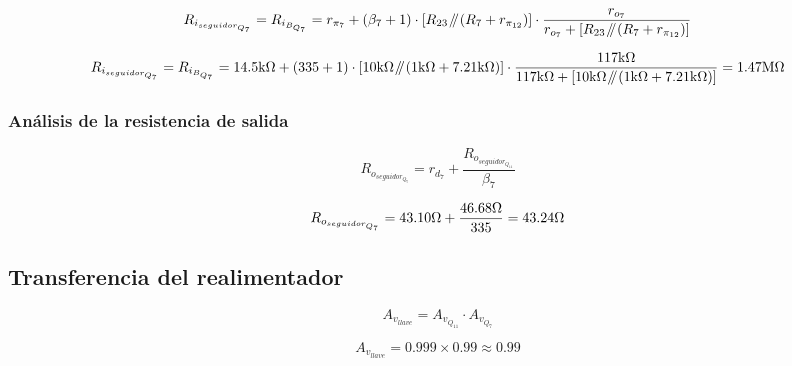 \begin{equation}
R_{i_{seguidor_{Q_{7}}}} = R_{i_{B_{Q_{7}}}} = r_{\pi_{7}} + \left( \beta_{7} + 1 \right) \cdot  \left[  R_{23} \parallelresistors \left(  R_{7} + r_{\pi_{12}} \right)   \right]  \cdot \frac{  r_{o_{7}} }{  r_{o_{7}} + \left[  R_{23} \parallelresistors \left(  R_{7} + r_{\pi_{12}} \right)   \right]  }
\end{equation}


\begin{equation*}
R_{i_{seguidor_{Q_{7}}}} = R_{i_{B_{Q_{7}}}} = 14.5 \si[per-mode=symbol]{\kilo\ohm} + \left( 335 + 1 \right) \cdot  \left[  10 \si[per-mode=symbol]{\kilo\ohm} \parallelresistors \left(  1 \si[per-mode=symbol]{\kilo\ohm} + 7.21 \si[per-mode=symbol]{\kilo\ohm} \right)   \right]  \cdot \frac{  117 \si[per-mode=symbol]{\kilo\ohm} }{  117 \si[per-mode=symbol]{\kilo\ohm} + \left[  10 \si[per-mode=symbol]{\kilo\ohm} \parallelresistors \left(  1 \si[per-mode=symbol]{\kilo\ohm} + 7.21 \si[per-mode=symbol]{\kilo\ohm} \right)   \right]  } = 1.47 \si[per-mode=symbol]{\mega\ohm}
\end{equation*}

\subsubsection{Análisis de la resistencia de salida}

\begin{equation}
R_{o_{seguidor_{Q_{7}}}} = r_{d_{7}} + \frac{R_{o_{seguidor_{Q_{11}}}}}{\beta_{7}}  
\end{equation}

\begin{equation*}
R_{o_{seguidor_{Q_{7}}}} = 43.10 \si[per-mode=symbol]{\ohm} + \frac{46.68 \si[per-mode=symbol]{\ohm}}{335} = 43.24 \si[per-mode=symbol]{\ohm} 
\end{equation*}


\subsection{Transferencia del realimentador}

\begin{equation}
A_{v_{llave}} = A_{v_{Q_{11}}} \cdot A_{v_{Q_{7}}}
\end{equation}

\begin{equation*}
A_{v_{llave}} = 0.999 \times 0.99 \approx 0.99
\end{equation*}


